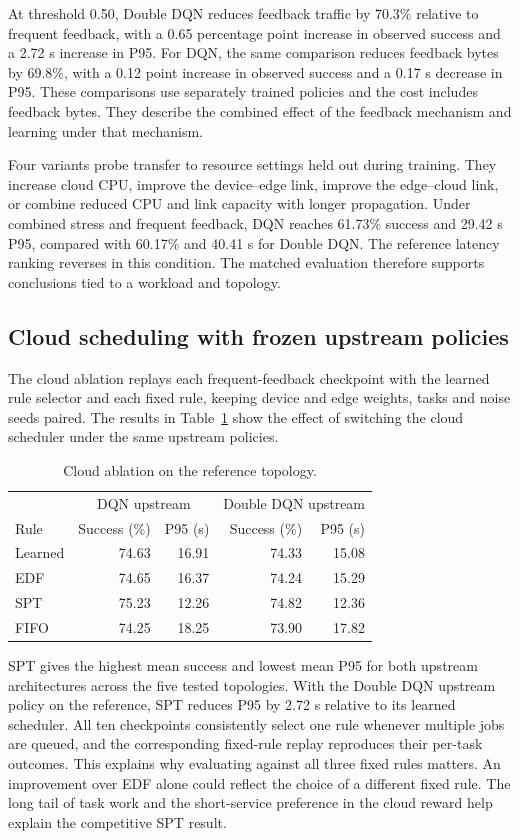 At threshold 0.50, Double DQN reduces feedback traffic by 70.3\%
relative to frequent feedback, with a 0.65 percentage point increase
in observed success and a 2.72 s increase in P95. For DQN, the same
comparison reduces feedback bytes by 69.8\%, with a 0.12 point
increase in observed success and a 0.17 s decrease in P95.
These comparisons use separately trained policies and the cost
includes feedback bytes. They describe the combined effect of the
feedback mechanism and learning under that mechanism.

Four variants probe transfer to resource settings held out during
training. They increase cloud CPU, improve the device--edge link,
improve the edge--cloud link, or combine reduced CPU and link
capacity with longer propagation. Under combined stress and
frequent feedback, DQN reaches 61.73\% success and 29.42 s P95,
compared with 60.17\% and 40.41 s for Double DQN. The reference
latency ranking reverses in this condition. The matched evaluation
therefore supports conclusions tied to a workload and topology.

\subsection{Cloud scheduling with frozen upstream policies}
The cloud ablation replays each frequent-feedback checkpoint with
the learned rule selector and each fixed rule, keeping device and
edge weights, tasks and noise seeds paired. The results in
Table~\ref{tab:cloud} show the effect of switching the cloud scheduler
under the same upstream policies.

\begin{table}[t]
\centering
\caption{Cloud ablation on the reference topology.}
\label{tab:cloud}
\footnotesize
\begin{tabular}{@{}lrrrr@{}}
\toprule
 & \multicolumn{2}{c}{DQN upstream} & \multicolumn{2}{c}{Double DQN upstream} \\
Rule & Success (\%) & P95 (s) & Success (\%) & P95 (s) \\
\midrule
Learned & 74.63 & 16.91 & 74.33 & 15.08 \\
EDF & 74.65 & 16.37 & 74.24 & 15.29 \\
SPT & 75.23 & 12.26 & 74.82 & 12.36 \\
FIFO & 74.25 & 18.25 & 73.90 & 17.82 \\
\bottomrule
\end{tabular}
\end{table}

SPT gives the highest mean success and lowest mean P95 for both
upstream architectures across the five tested topologies. With the
Double DQN upstream policy on the reference, SPT reduces P95 by
2.72 s relative to its learned scheduler. All ten checkpoints
consistently select one rule whenever multiple jobs are queued, and
the corresponding fixed-rule replay reproduces their per-task
outcomes. This explains why evaluating against all three fixed rules
matters. An improvement over EDF alone could reflect the choice of a
different fixed rule. The long tail of task work and the short-service
preference in the cloud reward help explain the competitive SPT result.

